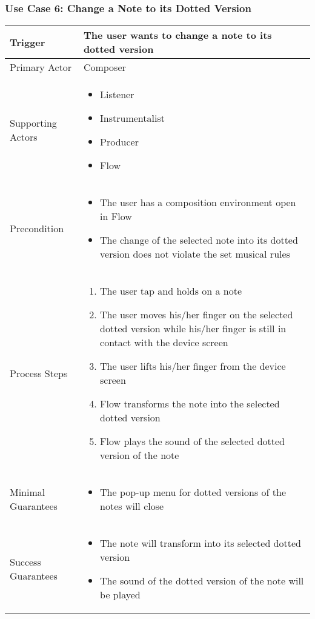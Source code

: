 \subsubsection{Use Case 6: Change a Note to its Dotted Version}

\begin{tabularx}{\textwidth}{|X|X|}
\hline
Trigger & 
The user wants to change a note to its dotted version \\
\hline
Primary Actor & 
Composer \\
\hline
Supporting Actors & 
\begin{itemize}
\item Listener
\item Instrumentalist
\item Producer
\item Flow
\end{itemize} \\
\hline
Precondition & 
\begin{itemize}
\item The user has a composition environment open in Flow
\item The change of the selected note into its dotted version does not violate the set musical rules
\end{itemize} \\
\hline
Process Steps & 
\begin{enumerate}
\item The user tap and holds on a note
\item The user moves his/her finger on the selected dotted version while his/her finger is still in contact with the device screen
\item The user lifts his/her finger from the device screen
\item Flow transforms the note into the selected dotted version
\item Flow plays the sound of the selected dotted version of the note
\end{enumerate} \\
\hline
Minimal Guarantees & 
\begin{itemize}
  \item The pop-up menu for dotted versions of the notes will close
\end{itemize} \\
\hline
Success Guarantees & 
\begin{itemize}
  \item The note will transform into its selected dotted version
  \item The sound of the dotted version of the note will be played 
\end{itemize} \\
\hline
\end{tabularx}


